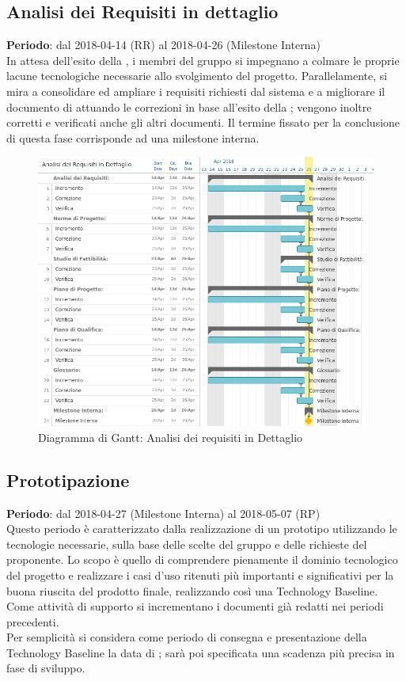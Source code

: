 \subsection{Analisi dei Requisiti in dettaglio}
\textbf{Periodo}: dal 2018-04-14 (RR) al 2018-04-26 (Milestone Interna)\\

In attesa dell'esito della \RR{}, i membri del gruppo si impegnano a colmare le proprie lacune tecnologiche necessarie allo svolgimento del progetto. Parallelamente, si mira a consolidare ed ampliare i requisiti richiesti dal sistema e a migliorare il documento di \AdR{} attuando le correzioni in base all’esito della \RR{}; vengono inoltre corretti e verificati anche gli altri documenti. Il termine fissato per la conclusione di questa fase corrisponde ad una milestone interna.

\begin{figure}[h!]
	\centerline{\includegraphics[scale=0.5]{img/DiagrammiGantt/AnalisiRequisitiDettaglio.jpg}}
	\caption{Diagramma di Gantt: Analisi dei requisiti in Dettaglio}
	\label{fig:gantt_ana_req_dett}
\end{figure}
\clearpage

\subsection{Prototipazione}
\textbf{Periodo}: dal 2018-04-27 (Milestone Interna) al 2018-05-07 (RP)\\

Questo periodo è caratterizzato dalla realizzazione di un prototipo utilizzando le tecnologie necessarie, sulla base delle scelte del gruppo \Gruppo{} e delle richieste del proponente.
Lo scopo è quello di comprendere pienamente il dominio tecnologico del progetto e realizzare i casi d'uso ritenuti più importanti e significativi per la buona riuscita del prodotto finale, realizzando così una Technology Baseline. \\ 
Come attività di supporto si incrementano i documenti già redatti nei periodi precedenti.\\
Per semplicità si considera come periodo di consegna e presentazione della Technology Baseline la data di \RP{}; sarà poi specificata una scadenza più precisa in fase di sviluppo.

